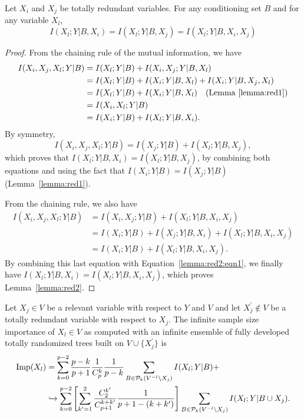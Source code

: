 \begin{lemma}\label{lemma:red2}
Let $X_i$ and $X_j$ be totally redundant variables. For any conditioning set
$B$ and for any variable $X_l$,
\begin{equation}
I(X_l;Y|B,X_i) = I(X_l;Y|B, X_j) = I(X_l;Y|B, X_i, X_j) \label{lemma:red2:eqn}
\end{equation}
\end{lemma}

\begin{proof}
From the chaining rule of the mutual information, we have
\begin{align}
I(X_i,X_j,X_l;Y|B) &= I(X_l;Y|B) + I(X_i,X_j;Y|B,X_l) \nonumber \\
                   &= I(X_l;Y|B) + I(X_i;Y|B,X_l) + I(X_i;Y|B, X_j, X_l) \nonumber \\
                   &= I(X_l;Y|B) + I(X_i;Y|B,X_l) \quad\text{(Lemma~\ref{lemma:red1})} \nonumber \\
                   &= I(X_i, X_l;Y|B) \nonumber \\
                   &= I(X_i;Y|B) + I(X_l;Y|B,X_i) \label{lemma:red2:eqn1}.
\end{align}
By symmetry,
\begin{equation}\label{lemma:red2:eqn2}
I(X_i,X_j,X_l;Y|B) = I(X_j;Y|B) + I(X_l;Y|B,X_j),
\end{equation}
which proves that $I(X_l;Y|B,X_i) = I(X_l;Y|B, X_j)$, by combining both equations
and using the fact that $I(X_i;Y|B) = I(X_j;Y|B)$ (Lemma~\ref{lemma:red1}).

From the chaining rule, we also have
\begin{align}
I(X_i,X_j,X_l;Y|B) &= I(X_i, X_j;Y|B) + I(X_l;Y|B,X_i,X_j) \nonumber \\
                   &= I(X_i; Y|B) + I(X_j;Y|B, X_i) + I(X_l;Y|B,X_i,X_j) \nonumber \\
                   &= I(X_i; Y|B) + I(X_l;Y|B,X_i,X_j).
\end{align}
By combining this last equation with Equation~\ref{lemma:red2:eqn1},
we finally have $I(X_l;Y|B,X_i) = I(X_l;Y|B,X_i,X_j)$, which proves
Lemma~\ref{lemma:red2}.
\end{proof}

\begin{proposition}\label{prop:red:other}
Let $X_j\in V$ be a relevant variable with respect to $Y$ and $V$ and let
$X_j^\prime \notin V$ be a totally redundant variable with respect to $X_j$.
The infinite sample size importance of $X_l \in V$ as computed with an infinite
ensemble of fully developed totally randomized trees built on $V\cup
\{X_j^\prime\}$ is
\begin{align}\label{prop:red:other:eqn}
\text{Imp}(X_l) &= \sum_{k=0}^{p-2} \frac{p-k}{p+1} \frac{1}{C_p^k} \frac{1}{p-k} \sum_{B \in {\cal P}_k(V^{-l} \setminus X_j)} I(X_l;Y|B) + \\
                & \hookrightarrow \sum_{k=0}^{p-2}  \left[ \sum_{k'=1}^2 \frac{C^{k'}_2}{C_{p+1}^{k+k'}} \frac{1}{p+1-(k+k')} \right]  \sum_{B \in {\cal P}_k(V^{-l}\setminus X_j)} I(X_l;Y|B\cup X_j). \nonumber
\end{align}
\end{proposition}

